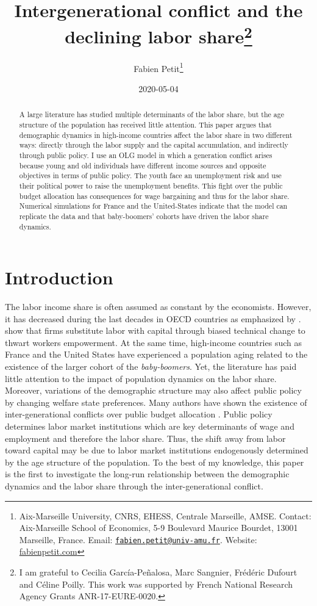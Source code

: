 \documentclass[
]{article}
\title{Intergenerational conflict and the declining labor share\thanks{I am grateful to Cecilia García-Peñalosa, Marc Sangnier, Frédéric Dufourt and Céline Poilly. This work was supported by French National Research Agency Grants ANR-17-EURE-0020.}}
\author{Fabien Petit\footnote{Aix-Marseille University, CNRS, EHESS, Centrale Marseille, AMSE. Contact: Aix-Marseille School of Economics, 5-9 Boulevard Maurice Bourdet, 13001 Marseille, France. Email: \href{mailto:fabien.petit@univ-amu.fr}{\nolinkurl{fabien.petit@univ-amu.fr}}. Website: \href{https://www.fabienpetit.com}{fabienpetit.com}}}
\date{2020-05-04}
\begin{document}
\maketitle

\begin{abstract}
A large literature has studied multiple determinants of the labor share, but the age structure of the population has received little attention. This paper argues that demographic dynamics in high-income countries affect the labor share in two different ways: directly through the labor supply and the capital accumulation, and indirectly through public policy. I use an OLG model in which a generation conflict arises because young and old individuals have different income sources and opposite objectives in terms of public policy. The youth face an unemployment risk and use their political power to raise the unemployment benefits. This fight over the public budget allocation has consequences for wage bargaining and thus for the labor share. Numerical simulations for France and the United-States indicate that the model can replicate the data and that baby-boomers’ cohorts have driven the labor share dynamics.
\end{abstract}

\clearpage\doublespacing

\hypertarget{intro}{%
\section{Introduction}\label{intro}}

The labor income share is often assumed as constant by the economists. However, it has decreased during the last decades in OECD countries as emphasized by \citet{Karabarbounis2014}.
\citet{Caballero1998} show that firms substitute labor with capital through biased technical change to thwart workers empowerment.
At the same time, high-income countries such as France and the United States have experienced a population aging related to the existence of the larger cohort of the \emph{baby-boomers}.
Yet, the literature has paid little attention to the impact of population dynamics on the labor share.
Moreover, variations of the demographic structure may also affect public policy by changing welfare state preferences. Many authors have shown the existence of inter-generational conflicts over public budget allocation \citep[see, for example,][]{Busemeyer2009, Sorensen2013}.
Public policy determines labor market institutions which are key determinants of wage and employment and therefore the labor share. Thus, the shift away from labor toward capital may be due to labor market institutions endogenously determined by the age structure of the population.
To the best of my knowledge, this paper is the first to investigate the long-run relationship between the demographic dynamics and the labor share through the inter-generational conflict.
\end{document}
